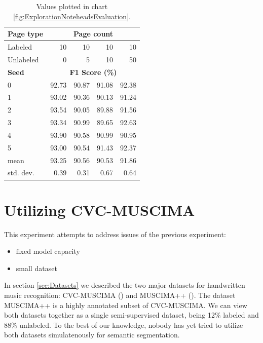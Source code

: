 \begin{table}[ht]
    \centering
    \begin{tabular}{l@{\hspace{2.0cm}}rrrr}
        \toprule
        \textbf{Page type} & \multicolumn{4}{c}{\textbf{Page count}} \\
        \midrule
        Labeled   & 10 & 10 & 10 & 10 \\
        Unlabeled & 0  & 5  & 10 & 50 \\
        \midrule
        \textbf{Seed} & \multicolumn{4}{c}{\textbf{F1 Score (\%)}} \\
        \midrule
        0 & 92.73 & 90.87 & 91.08 & 92.38 \\
        1 & 93.02 & 90.36 & 90.13 & 91.24 \\
        2 & 93.54 & 90.05 & 89.88 & 91.56 \\
        3 & 93.34 & 90.99 & 89.65 & 92.63 \\
        4 & 93.90 & 90.58 & 90.99 & 90.95 \\
        5 & 93.00 & 90.54 & 91.43 & 92.37 \\
        \midrule
        mean & 93.25 & 90.56 & 90.53 & 91.86 \\
        std. dev. & 0.39 & 0.31 & 0.67 & 0.64 \\
        \bottomrule
    \end{tabular}
    \caption{Values plotted in chart \ref{fig:ExplorationNoteheadsEvaluation}.}
    \label{tab:ExplorationNoteheads}
\end{table}


\section{Utilizing CVC-MUSCIMA}
\label{sec:UtilizingCvcMuscima}

This experiment attempts to address issues of the previous experiment:

\begin{itemize}
    \item fixed model capacity
    \item small dataset
\end{itemize}

In section \ref{sec:Datasets} we described the two major datasets for handwritten music recognition: CVC-MUSCIMA (\cite{CvcMuscima}) and MUSCIMA++ (\cite{MuscimaPP}). The dataset MUSCIMA++ is a highly annotated subset of CVC-MUSCIMA. We can view both datasets together as a single semi-supervised dataset, being 12\% labeled and 88\% unlabeled. To the best of our knowledge, nobody has yet tried to utilize both datasets simulatenously for semantic segmentation.

